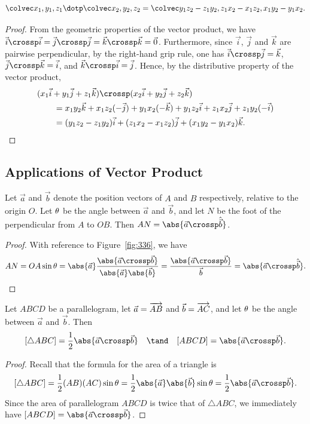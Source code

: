 \begin{proposition}
    \[\cveciii{x_1}{y_1}{z_1} \dotp \cveciii{x_2}{y_2}{z_2} = \cveciii{y_1 z_2 - z_1 y_2}{z_1 x_2 - x_1 z_2}{x_1 y_2 - y_1 x_2}.\]
\end{proposition}
\begin{proof}
    From the geometric properties of the vector product, we have $\vec i \crossp \vec i = \vec j \crossp \vec j = \vec k \crossp \vec k = \vec 0$. Furthermore, since $\vec i$, $\vec j$ and $\vec k$ are pairwise perpendicular, by the right-hand grip rule, one has $\vec i \crossp \vec j = \vec k$, $\vec j \crossp \vec k = \vec i$, and $\vec k \crossp \vec i = \vec j$. Hence, by the distributive property of the vector product,
    \begin{align*}
        &(x_1 \vec i + y_1 \vec j + z_1 \vec k) \crossp (x_2 \vec i + y_2 \vec j + z_2 \vec k) \\
        &\hspace{2em}= x_1 y_2 \vec k + x_1 z_2 (-\vec j) + y_1 x_2 (-\vec k) + y_1 z_2 \vec i + z_1 x_2 \vec j + z_1 y_2 (-\vec i) \\
        &\hspace{2em}=(y_1 z_2 - z_1 y_2) \vec i + (z_1 x_2 - x_1 z_2) \vec j + (x_1 y_2 - y_1 x_2) \vec k.
    \end{align*}
\end{proof}

\subsection{Applications of Vector Product}

\begin{proposition}
    Let $\vec a$ and $\vec b$ denote the position vectors of $A$ and $B$ respectively, relative to the origin $O$. Let $\theta$ be the angle between $\vec a$ and $\vec b$, and let $N$ be the foot of the perpendicular from $A$ to $OB$. Then $AN = \abs{\vec a \crossp \hat{\vec b}}$.
\end{proposition}
\begin{proof}
    With reference to Figure~\ref{fig:336}, we have \[AN = OA \sin \t = \abs{\vec a} \frac{\abs{\vec a \crossp \vec b}}{\abs{\vec a}\abs{\vec b}} = \frac{\abs{\vec a \crossp \vec b}}{\vec b} = \abs{\vec a \crossp \hat{\vec b}}.\]
\end{proof}

\begin{proposition}
    Let $ABCD$ be a parallelogram, let $\vec a = \overrightarrow{AB}$ and $\vec b = \overrightarrow{AC}$, and let $\theta$ be the angle between $\vec a$ and $\vec b$. Then \[[\triangle ABC] = \frac12 \abs{\vec a \crossp \vec b} \quad \tand \quad [ABCD] = \abs{\vec a \crossp \vec b}.\]
\end{proposition}
\begin{proof}
    Recall that the formula for the area of a triangle is \[[\triangle ABC] = \frac12 (AB)(AC) \sin \t = \frac12 \abs{\vec a} \abs{\vec b} \sin \t = \frac12 \abs{\vec a \crossp \vec b}.\] Since the area of parallelogram $ABCD$ is twice that of $\triangle ABC$, we immediately have $[ABCD] = \abs{\vec a \crossp \vec b}$.
\end{proof}